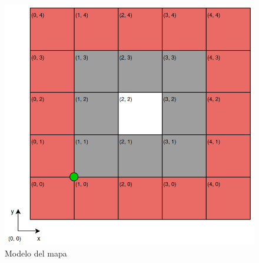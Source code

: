 \begin{figure}[H]
    \centering
    \includegraphics[width=0.8\linewidth]{images/modelo_del_mapa.png}
    \caption{Modelo del mapa}
    \label{fig:modelomapa}
\end{figure}
